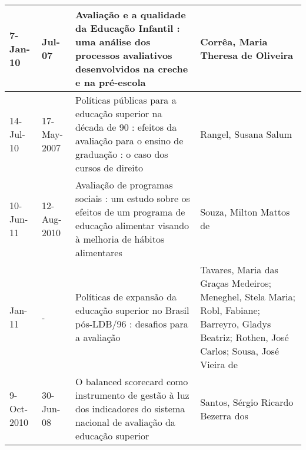 \begin{table}
{\begin{tabular}{|m{1.3cm}|m{1.3cm}|p{7cm}|p{6cm}|}
7-Jan-10    & Jul-07      & Avaliação e a qualidade da Educação Infantil : uma análise dos processos avaliativos desenvolvidos na creche e na pré-escola                                                                                          & Corrêa, Maria Theresa de Oliveira                                                                                                                                                                                                                            \\ \hline
14-Jul-10   & 17-May-2007 & Políticas públicas para a educação superior na década de 90 : efeitos da avaliação para o ensino de graduação : o caso dos cursos de direito                                                                          & Rangel, Susana Salum                                                                                                                                                                                                                                         \\ \hline
10-Jun-11   & 12-Aug-2010 & Avaliação de programas sociais : um estudo sobre os efeitos de um programa de educação alimentar visando à melhoria de hábitos alimentares                                                                            & Souza, Milton Mattos de                                                                                                                                                                                                                                      \\ \hline
Jan-11      & -           & Políticas de expansão da educação superior no Brasil pós-LDB/96 : desafios para a avaliação                                                                                                                           & Tavares, Maria das Graças Medeiros; Meneghel, Stela Maria; Robl, Fabiane; Barreyro, Gladys Beatriz; Rothen, José Carlos; Sousa, José Vieira de                                                                                                               \\ \hline
9-Oct-2010  & 30-Jun-08   & O balanced scorecard como instrumento de gestão à luz dos indicadores do sistema nacional de avaliação da educação superior                                                                                           & Santos, Sérgio Ricardo Bezerra dos                                                                                                                                                                                                                           \\ \hline

\end{tabular}}
\end{table}
